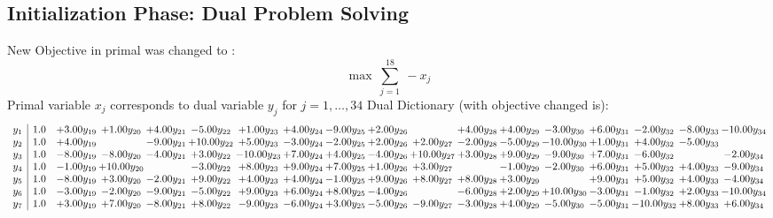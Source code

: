 \documentclass[9pt]{article}
\begin{document}
\subsection{Initialization Phase: Dual Problem Solving}
New Objective in primal was changed to : \[ \max\ \sum_{j=1}^{18}\ - x_j \] 
Primal variable $x_j$ corresponds to dual variable $y_j$ for $j = 1,\ldots,34$
Dual Dictionary (with objective changed is): 
\[\begin{array}{c| c c@{\hskip 2pt} c@{\hskip 2pt} c@{\hskip 2pt} c@{\hskip 2pt} c@{\hskip 2pt} c@{\hskip 2pt} c@{\hskip 2pt} c@{\hskip 2pt} c@{\hskip 2pt} c@{\hskip 2pt} c@{\hskip 2pt} c@{\hskip 2pt} c@{\hskip 2pt} c@{\hskip 2pt} c@{\hskip 2pt} c@{\hskip 2pt} }
 y_{1}   &  1.0 & +  3.00 y_{19} & +  1.00 y_{20} & +  4.00 y_{21} & -5.00 y_{22} & +  1.00 y_{23} & +  4.00 y_{24} & -9.00 y_{25} & +  2.00 y_{26} &   & +  4.00 y_{28} & +  4.00 y_{29} & -3.00 y_{30} & +  6.00 y_{31} & -2.00 y_{32} & -8.00 y_{33} & -10.00 y_{34}\\
 y_{2}   &  1.0 & +  4.00 y_{19} &   & -9.00 y_{21} & + 10.00 y_{22} & +  5.00 y_{23} & -3.00 y_{24} & -2.00 y_{25} & +  2.00 y_{26} & +  2.00 y_{27} & -2.00 y_{28} & -5.00 y_{29} & -10.00 y_{30} & +  1.00 y_{31} & +  4.00 y_{32} & -5.00 y_{33} &   \\
 y_{3}   &  1.0 & -8.00 y_{19} & -8.00 y_{20} & -4.00 y_{21} & +  3.00 y_{22} & -10.00 y_{23} & +  7.00 y_{24} & +  4.00 y_{25} & -4.00 y_{26} & + 10.00 y_{27} & +  3.00 y_{28} & +  9.00 y_{29} & -9.00 y_{30} & +  7.00 y_{31} & -6.00 y_{32} &   & -2.00 y_{34}\\
 y_{4}   &  1.0 & -1.00 y_{19} & + 10.00 y_{20} &   & -3.00 y_{22} & +  8.00 y_{23} & +  9.00 y_{24} & +  7.00 y_{25} & +  1.00 y_{26} & +  3.00 y_{27} &   & -1.00 y_{29} & -2.00 y_{30} & +  6.00 y_{31} & +  5.00 y_{32} & +  4.00 y_{33} & -9.00 y_{34}\\
 y_{5}   &  1.0 & -8.00 y_{19} & +  3.00 y_{20} & -2.00 y_{21} & +  9.00 y_{22} & +  4.00 y_{23} & +  4.00 y_{24} & -1.00 y_{25} & +  9.00 y_{26} & +  8.00 y_{27} & +  8.00 y_{28} & +  3.00 y_{29} &   & +  9.00 y_{31} & +  5.00 y_{32} & +  4.00 y_{33} & -4.00 y_{34}\\
 y_{6}   &  1.0 & -3.00 y_{19} & -2.00 y_{20} & -9.00 y_{21} & -5.00 y_{22} & +  9.00 y_{23} & +  6.00 y_{24} & +  8.00 y_{25} & -4.00 y_{26} &   & -6.00 y_{28} & +  2.00 y_{29} & + 10.00 y_{30} & -3.00 y_{31} & -1.00 y_{32} & +  2.00 y_{33} & -10.00 y_{34}\\
 y_{7}   &  1.0 & +  3.00 y_{19} & +  7.00 y_{20} & -8.00 y_{21} & +  8.00 y_{22} & -9.00 y_{23} & -6.00 y_{24} & +  3.00 y_{25} & -5.00 y_{26} & -9.00 y_{27} & -3.00 y_{28} & +  4.00 y_{29} & -5.00 y_{30} & -5.00 y_{31} & -10.00 y_{32} & +  8.00 y_{33} & +  6.00 y_{34}\\

\end{array}\]
\end{document}
